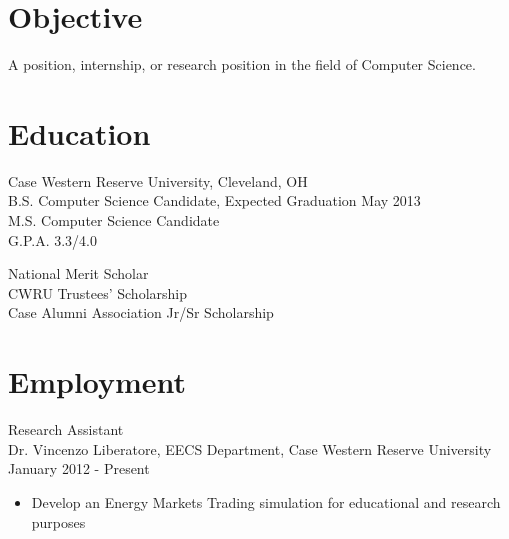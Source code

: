 \documentclass{res} %
\begin{document}
 


  \address{{\bf Present Address} \\   2058 E. 115th St. \\ Cleveland, OH 44106}
  \address{{\bf Permanent Address} \\ 1896 Apple Valley Rd.\\ Bolingbrook, IL 60490}
                                               
  \begin{resume}
   
  \section{Objective}
    A position, internship, or research position in the field of Computer Science.
   
  \section{Education} 
    Case Western Reserve University, Cleveland, OH \\
    B.S. Computer Science Candidate, Expected Graduation May 2013 \\
    M.S. Computer Science Candidate \\
    G.P.A. 3.3/4.0

    National Merit Scholar \\
    CWRU Trustees' Scholarship \\
    Case Alumni Association Jr/Sr Scholarship
   
  \section{Employment} 
    Research Assistant \\
    Dr. Vincenzo Liberatore, EECS Department, Case Western Reserve University \\
    January 2012 - Present
    \begin{itemize} \itemsep -2pt
      \item Develop an Energy Markets Trading simulation for educational and research purposes
    \end{itemize}


\end{resume}
\end{document}
